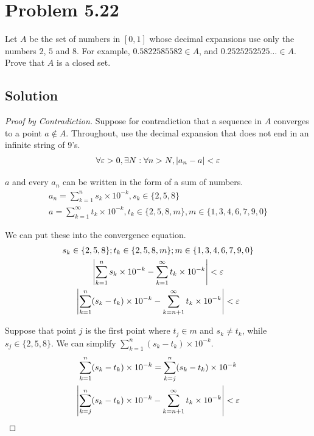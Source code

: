 \documentclass[12pt]{report}
\begin{document}
\section{Problem 5.22}
    Let $A$ be the set of numbers in $\left[ 0, 1 \right]$ whose decimal expansions use only the numbers $2$, $5$ and $8$. 
    For example, $0.5822585582 \in A$, and $0.2525252525\ldots \in A$. 
    Prove that $A$ is a closed set.
    
    \subsection{Solution}
    \begin{proof}[Proof by Contradiction]
        Suppose for contradiction that a sequence in $A$ converges to a point $a \notin A$.
        Throughout, use the decimal expansion that does not end in an infinite string of 9's.
        \begin{gather}
            \forall \varepsilon > 0, \exists N : \forall n > N, \left| a_n - a \right| < \varepsilon
        \end{gather}

        $a$ and every $a_n$ can be written in the form of a sum of numbers.
        \begin{gather}
            a_n = \sum_{k=1}^{n} s_k \times 10^{-k}, s_k \in \{2, 5, 8\}\\
            a = \sum_{k=1}^{\infty} t_k \times 10^{-k}, t_k \in \{2, 5, 8, m\}, m \in \{1, 3, 4, 6, 7, 9, 0\}
        \end{gather}

        We can put these into the convergence equation.
        \begin{gather}
            s_k \in \{2, 5, 8\}; t_k \in \{2, 5, 8, m\}; m \in \{1, 3, 4, 6, 7, 9, 0\}\\
            \left| \sum_{k=1}^{n} s_k \times 10^{-k} - \sum_{k=1}^{\infty} t_k \times 10^{-k} \right| < \varepsilon\\
            \left| \sum_{k=1}^{n} (s_k - t_k) \times 10^{-k} - \sum_{k=n+1}^{\infty} t_k \times 10^{-k} \right| < \varepsilon
        \end{gather}

        Suppose that point $j$ is the first point where $t_j \in m$ and $s_k \neq t_k$, while $s_j \in \{2, 5, 8\}$.
        We can simplify $\sum_{k=1}^{n} (s_k - t_k) \times 10^{-k}$.
        \begin{gather}
            \sum_{k=1}^{n} (s_k - t_k) \times 10^{-k} = \sum_{k=j}^{n} (s_k - t_k) \times 10^{-k}\\
            \left| \sum_{k=j}^{n} (s_k - t_k) \times 10^{-k} - \sum_{k=n+1}^{\infty} t_k \times 10^{-k} \right| < \varepsilon
        \end{gather}


\end{proof}
\end{document}
